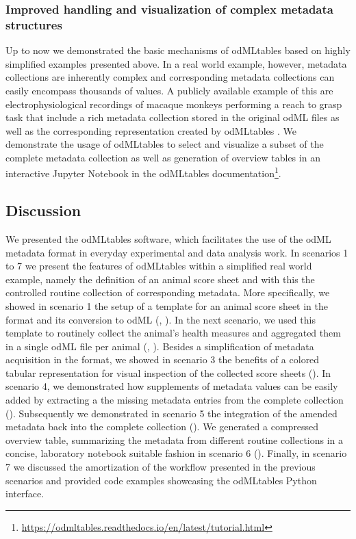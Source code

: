 \subsubsection*{Improved handling and visualization of complex metadata structures}
Up to now we demonstrated the basic mechanisms of odMLtables based on highly simplified examples presented above. In a real world example, however, metadata collections are inherently complex and corresponding metadata collections can easily encompass thousands of values. A publicly available example of this are electrophysiological recordings of macaque monkeys performing a reach to grasp task that include a rich metadata collection stored in the original odML files as well as the corresponding  representation created by odMLtables \citep{Brochier_2018}. We demonstrate the usage of odMLtables to select and visualize a subset of the complete metadata collection as well as generation of overview tables in an interactive Jupyter Notebook in the odMLtables documentation\footnote{\url{https://odmltables.readthedocs.io/en/latest/tutorial.html}}.

\subsection{Discussion}
\label{sec:Discussion}

We presented the odMLtables software, which facilitates the use of the odML metadata format in everyday experimental and data analysis work. In scenarios 1 to 7 we present the features of odMLtables within a simplified real world example, namely the definition of an animal score sheet and with this the controlled routine collection of corresponding metadata. More specifically, we showed in scenario 1 the setup of a template for an animal score sheet in the  format and its conversion to odML (\fconvert, \fgenerate). In the next scenario, we used this template to routinely collect the animal's health measures and aggregated them in a single odML file per animal (\fconvert, \fmerge). Besides a simplification of metadata acquisition in the  format,  we showed in scenario 3 the benefits of a colored tabular representation for visual inspection of the collected score sheets (\fconvert). In scenario 4, we demonstrated how supplements of metadata values can be easily added by extracting a the missing metadata entries from the complete collection (\ffilter). Subsequently we demonstrated in scenario 5 the integration of the amended metadata back into the complete collection (\fmerge). We generated a compressed overview table, summarizing the metadata from different routine collections in a concise, laboratory notebook suitable fashion in scenario 6 (\fcompare). Finally, in scenario 7 we discussed the amortization of the workflow presented in the previous scenarios and provided code examples showcasing the odMLtables Python interface.

